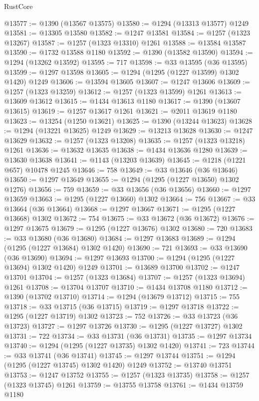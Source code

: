 \begin{lexlean}{RustCore}
\begin{coremodule}
@13577 := @1390 (@13567 @13575)
@13580 := @1294 (@13313 @13577) @1249
@13581 := @13305 @13580
@13582 := @1247 @13581
@13584 := @1257 (@1323 @13267)
@13587 := @1257 (@1323 @13310) @1261
@13588 := @13584 @13587
@13590 := @1732 @13588 @1180
@13592 := @1390 (@13582 @13590)
@13594 := @1294 (@13262 @13592)
@13595 := 717
@13598 := @33 @13595 (@36 @13595)
@13599 := @1297 @13598
@13605 := @1294 (@1295 (@1227 @13599) @1302 @1420) @1249
@13606 := @13594 @13605
@13607 := @1247 @13606
@13609 := @1257 (@1323 @13259)
@13612 := @1257 (@1323 @13599) @1261
@13613 := @13609 @13612
@13615 := @1434 @13613 @1180
@13617 := @1390 (@13607 @13615)
@13619 := @1257 @13617 @1261
@13621 := @2011 @13619 @1180
@13623 := @13254 (@1250 @13621)
@13625 := @1390 (@13244 @13623)
@13628 := @1294 (@13221 @13625) @1249
@13629 := @13213 @13628
@13630 := @1247 @13629
@13632 := @1257 (@1323 @13208)
@13635 := @1257 (@1323 @13218) @1261
@13636 := @13632 @13635
@13638 := @1434 @13636 @1280
@13639 := @13630 @13638
@13641 := @1143 (@13203 @13639)
@13645 := @1218 (@1221 @657) @10478 @1245
@13646 := 758
@13649 := @33 @13646 (@36 @13646)
@13650 := @1297 @13649
@13655 := @1294 (@1295 (@1227 @13650) @1302 @1276)
@13656 := 759
@13659 := @33 @13656 (@36 @13656)
@13660 := @1297 @13659
@13663 := @1295 (@1227 @13660) @1302
@13664 := 756
@13667 := @33 @13664 (@36 @13664)
@13668 := @1297 @13667
@13671 := @1295 (@1227 @13668) @1302
@13672 := 754
@13675 := @33 @13672 (@36 @13672)
@13676 := @1297 @13675
@13679 := @1295 (@1227 @13676) @1302
@13680 := 720
@13683 := @33 @13680 (@36 @13680)
@13684 := @1297 @13683
@13689 := @1294 (@1295 (@1227 @13684) @1302 @1420)
@13690 := 721
@13693 := @33 @13690 (@36 @13690)
@13694 := @1297 @13693
@13700 := @1294 (@1295 (@1227 @13694) @1302 @1420) @1249
@13701 := @13689 @13700
@13702 := @1247 @13701
@13704 := @1257 (@1323 @13684)
@13707 := @1257 (@1323 @13694) @1261
@13708 := @13704 @13707
@13710 := @1434 @13708 @1180
@13712 := @1390 (@13702 @13710)
@13714 := @1294 (@13679 @13712)
@13715 := 755
@13718 := @33 @13715 (@36 @13715)
@13719 := @1297 @13718
@13722 := @1295 (@1227 @13719) @1302
@13723 := 752
@13726 := @33 @13723 (@36 @13723)
@13727 := @1297 @13726
@13730 := @1295 (@1227 @13727) @1302
@13731 := 722
@13734 := @33 @13731 (@36 @13731)
@13735 := @1297 @13734
@13740 := @1294 (@1295 (@1227 @13735) @1302 @1420)
@13741 := 723
@13744 := @33 @13741 (@36 @13741)
@13745 := @1297 @13744
@13751 := @1294 (@1295 (@1227 @13745) @1302 @1420) @1249
@13752 := @13740 @13751
@13753 := @1247 @13752
@13755 := @1257 (@1323 @13735)
@13758 := @1257 (@1323 @13745) @1261
@13759 := @13755 @13758
@13761 := @1434 @13759 @1180

\end{coremodule}
\end{lexlean}
